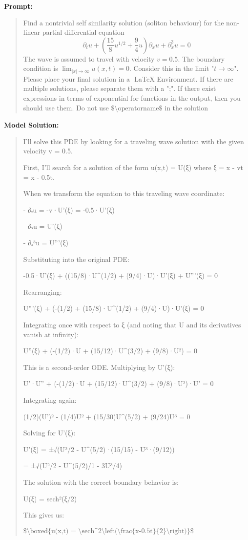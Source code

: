 \documentclass{article}
\begin{document}
\textbf{Prompt:}
\begin{quote}
Find a nontrivial self similarity solution (soliton behaviour) for the non-linear partial differential equation $$ \partial_t u + \left(\frac{15}{8} u^{1/2} + \frac{9}{4} u\right)\partial_x u + \partial_x^3 u=0 $$ The wave is assumed to travel with velocity $v=0.5$. The boundary condition is $\lim_{|x|\to\infty} u(x,t)=0$. Consider this in the limit "$t\rightarrow\infty$". Please place your final solution in a $\boxed{}$ LaTeX Environment. If there are multiple solutions, please separate them with a ";". If there exist expressions in terms of exponential for functions in the output, then you should use them. Do not use $\operatorname$ in the solution
\end{quote}
\textbf{Model Solution:}
\begin{quote}
I'll solve this PDE by looking for a traveling wave solution with the given velocity v = 0.5.



First, I'll search for a solution of the form u(x,t) = U(ξ) where ξ = x - vt = x - 0.5t.



When we transform the equation to this traveling wave coordinate:

- ∂ₜu = -v·U'(ξ) = -0.5·U'(ξ)

- ∂ₓu = U'(ξ)

- ∂ₓ³u = U'''(ξ)



Substituting into the original PDE:

-0.5·U'(ξ) + ((15/8)·U^(1/2) + (9/4)·U)·U'(ξ) + U'''(ξ) = 0



Rearranging:

U'''(ξ) + (-(1/2) + (15/8)·U^(1/2) + (9/4)·U)·U'(ξ) = 0



Integrating once with respect to ξ (and noting that U and its derivatives vanish at infinity):

U''(ξ) + (-(1/2)·U + (15/12)·U^(3/2) + (9/8)·U²) = 0



This is a second-order ODE. Multiplying by U'(ξ):

U'·U'' + (-(1/2)·U + (15/12)·U^(3/2) + (9/8)·U²)·U' = 0



Integrating again:

(1/2)(U')² - (1/4)U² + (15/30)U^(5/2) + (9/24)U³ = 0



Solving for U'(ξ):

U'(ξ) = ±√(U²/2 - U^(5/2)·(15/15) - U³·(9/12))

      = ±√(U²/2 - U^(5/2)/1 - 3U³/4)



The solution with the correct boundary behavior is:

U(ξ) = sech²(ξ/2)



This gives us:



$\boxed{u(x,t) = \sech^2\left(\frac{x-0.5t}{2}\right)}$
\end{quote}
\end{document}
